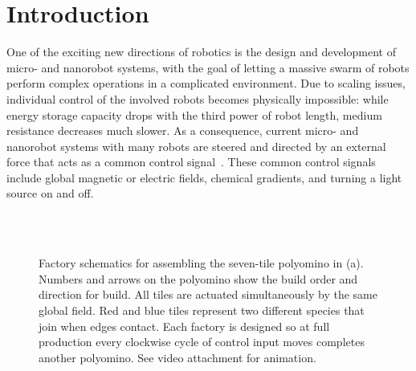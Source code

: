 \section{Introduction}\label{sec:Intro}

One of the exciting new directions of robotics is the design and development
of micro- and nanorobot systems, with the goal of letting a massive swarm of robots
perform complex operations in a complicated environment. Due to scaling 
issues, individual control of the involved robots becomes physically impossible:
while energy storage capacity drops with the third power of robot length,
medium resistance decreases much slower. As a consequence,
current micro- and nanorobot systems with many robots are steered and
directed by an external force that acts as a common control signal~\cite{Donald2013,Chiang2011,Hsi-Wen2012,Diller2013,Jing2013,Ou2013,Lanauze2013}.
These common control signals include global magnetic or electric fields,
chemical gradients, and turning a light source on and off. 

\begin{figure}
\centering
{}  \\ \vspace{-.8em}
 \\ \vspace{-.8em}      
\caption{\label{fig:factorySchematics}Factory schematics for assembling the seven-tile polyomino in (a).  Numbers and arrows on the polyomino show the build order and direction for build. All tiles are actuated simultaneously by the same global field. Red and blue tiles represent two different species that join when edges contact. Each factory is designed so at full production every clockwise cycle of control input moves completes another polyomino. See video attachment for animation.}
\end{figure}
 
